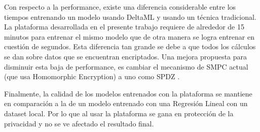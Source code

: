 \documentclass[
11pt, %
oneside, %
spanish, %
singlespacing, %
parskip, %
headsepline, %
chapterinoneline, %
]{MastersDoctoralThesis} %
\begin{document}
Con respecto a la performance, existe una diferencia considerable entre los tiempos entrenando un modelo usando DeltaML y usando un técnica tradicional. La plataforma desarrollada en el presente trabajo requiere de alrededor de 15 minutos para entrenar el mismo modelo que de otra manera se logra entrenar en cuestión de segundos. Esta diferencia tan grande se debe a que todos los cálculos se dan sobre datos que se encuentran encriptados.  Una mejora propuesta para disminuir esta baja de performance, es cambiar el mecanismo de SMPC actual (que usa Homomorphic Encryption) a uno como SPDZ \citep{spdz-1} \citep{spdz-2} \cite{spdz-prot} \cite{mpc-spdz}. 

Finalmente, la calidad de los modelos entrenados con la plataforma se mantiene en comparación a la de un modelo entrenado con una Regresión Lineal con un dataset local. Por lo que al usar la plataforma se gana en protección de la privacidad y no se ve afectado el resultado final.



\printbibliography[heading=bibnumbered, title=Referencias]

\end{document}
